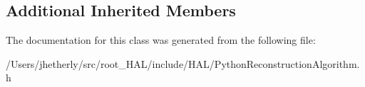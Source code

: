 \subsection*{Additional Inherited Members}


The documentation for this class was generated from the following file\-:\begin{DoxyCompactItemize}
\item 
/\-Users/jhetherly/src/root\-\_\-\-H\-A\-L/include/\-H\-A\-L/Python\-Reconstruction\-Algorithm.\-h\end{DoxyCompactItemize}
